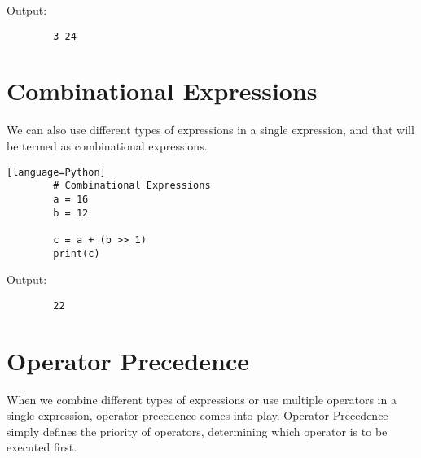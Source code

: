 \documentclass{article}
\begin{document}
	Output:
	\begin{verbatim}
		3 24
	\end{verbatim}
	
	\section{Combinational Expressions}
	
	We can also use different types of expressions in a single expression, and that will be termed as combinational expressions.
	
	\begin{verbatim}[language=Python]
		# Combinational Expressions 
		a = 16
		b = 12
		
		c = a + (b >> 1) 
		print(c)
	\end{verbatim}
	
	Output:
	\begin{verbatim}
		22
	\end{verbatim}
	
	\section{Operator Precedence}
	
	When we combine different types of expressions or use multiple operators in a single expression, operator precedence comes into play. Operator Precedence simply defines the priority of operators, determining which operator is to be executed first.
	
\end{document}

